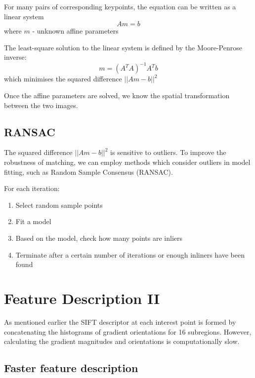 \documentclass{report}
\begin{document}
For many pairs of corresponding keypoints, the equation can be written as a
linear system
$$
    Am = b
$$
where $m$ - unknown affine parameters 

The least-square solution to the linear system is defined by the Moore-Penrose inverse:
$$
    m = (A^T A)^{-1} A^T b
$$
which minimises the squared difference $||Am - b||^2$

Once the affine parameters are solved, we know the spatial transformation between the two images.

\section{RANSAC}

The squared difference $||Am - b||^2$ is sensitive to outliers. To improve the robustness of matching, we can
employ methods which consider outliers in model fitting, such as Random Sample
Consensus (RANSAC).

For each iteration:
\begin{enumerate}
    \item Select random sample points 
    \item Fit a model 
    \item Based on the model, check how many points are inliers 
    \item Terminate after a certain number of iterations or enough inliners have been
    found 
\end{enumerate}

\chapter{Feature Description II}

As mentioned earlier the SIFT descriptor at each interest point is formed by
concatenating the histograms of gradient orientations for 16 subregions.
However, calculating the gradient magnitudes and orientations is computationally
slow. 

\section{Faster feature description}
\end{document}
